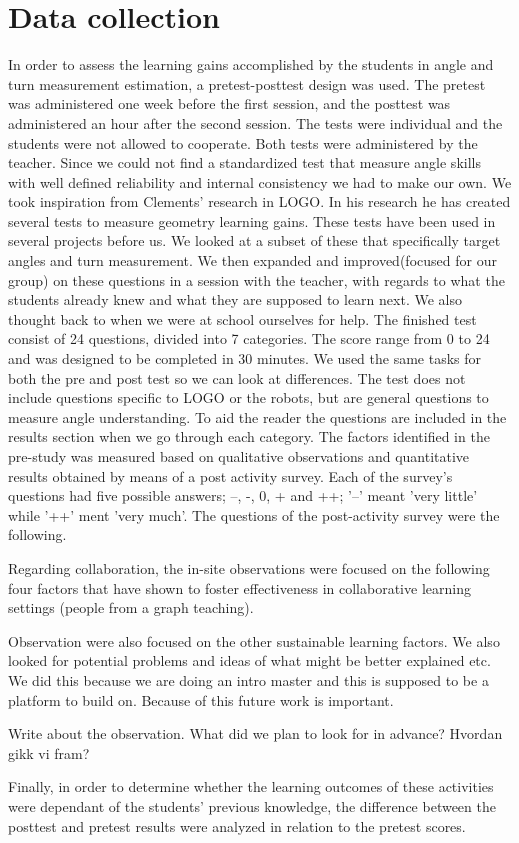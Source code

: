 \chapter{Data collection}
In order to assess the learning gains accomplished by the students in angle and turn measurement estimation, a pretest-posttest design was used. The pretest was administered one week before the first session, and the posttest was administered an hour after the second session. The tests were individual and the students were not allowed to cooperate. Both tests were administered by the teacher. Since we could not find a standardized test that measure angle skills with well defined reliability and internal consistency we had to make our own. We took inspiration from Clements' research in LOGO. In his research he has created several tests to measure geometry learning gains. These tests have been used in several projects before us. We looked at a subset of these that specifically target angles and turn measurement. We then expanded and improved(focused for our group) on these questions in a session with the teacher, with regards to what the students already knew and what they are supposed to learn next. We also thought back to when we were at school ourselves for help. The finished test consist of 24 questions, divided into 7 categories. The score range from 0 to 24 and was designed to be completed in 30 minutes. We used the same tasks for both the pre and post test so we can look at differences. The test does not include questions specific to LOGO or the robots, but are general questions to measure angle understanding. To aid the reader the questions are included in the results section when we go through each category. The factors identified in the pre-study was measured based on qualitative observations and quantitative results obtained by means of a post activity survey. Each of the survey's questions had five possible answers; --, -, 0, + and ++; '--' meant 'very little' while '++' ment 'very much'. The questions of the post-activity survey were the following.

Regarding collaboration, the in-site observations were focused on the following four factors that have shown to foster effectiveness in collaborative learning settings (people from a graph teaching).

Observation were also focused on the other sustainable learning factors. We also looked for potential problems and ideas of what might be better explained etc. We did this because we are doing an intro master and this is supposed to be a platform to build on. Because of this future work is important. 

Write about the observation. What did we plan to look for in advance? Hvordan gikk vi fram?

Finally, in order to determine whether the learning outcomes of these activities were dependant of the students' previous knowledge, the difference between the posttest and pretest results were analyzed in relation to the pretest scores.
